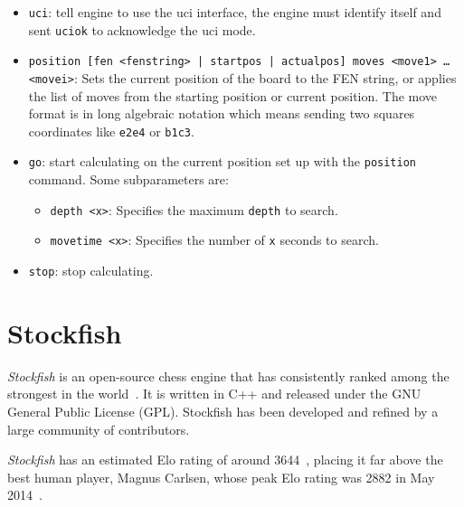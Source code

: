 \begin{itemize}[itemsep=1pt]

    \item \texttt{uci}: tell engine to use the uci interface, the engine must identify itself and sent \texttt{uciok} to acknowledge the uci mode.
    \item \texttt{position [fen <fenstring> | startpos | actualpos] moves <move1> \ldots \\<movei>}: Sets the current position of the board to the FEN string, or applies the list of moves from the starting position or current position. The move format is in long algebraic notation which means sending two squares coordinates like \texttt{e2e4} or \texttt{b1c3}.

    \item \texttt{go}: start calculating on the current position set up with the \texttt{position} command. Some  subparameters are:
    \begin{itemize}[itemsep=1pt]
        \item \texttt{depth <x>}: Specifies the maximum \texttt{depth} to search.
        \item \texttt{movetime <x>}: Specifies the number of \texttt{x} seconds to search. 
    \end{itemize}

    \item \texttt{stop}: stop calculating.
\end{itemize}

\newpage

\section{Stockfish}
\label{sec:stockfish}

\par \textit{Stockfish} is an open-source chess engine that has consistently ranked among the strongest in the world~\cite{Stockfish}. It is written in C++ and released under the GNU General Public License (GPL). Stockfish has been developed and refined by a large community of contributors.

\vspace{1em}

\par \textit{Stockfish} has an estimated Elo rating of around 3644~\cite{StockfishElo}, placing it far above the best human player, Magnus Carlsen, whose peak Elo rating was 2882 in May 2014~\cite{MagnusCarlsenElo}.

